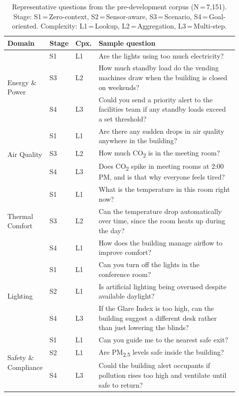 \documentclass[acmsmall]{acmart}
\begin{document}
\begin{table}[t]
\centering
\caption{Representative questions from the pre-development corpus (N\,=\,7{,}151). Stage: S1\,=\,Zero-context, S2\,=\,Sensor-aware, S3\,=\,Scenario, S4\,=\,Goal-oriented. Complexity: L1\,=\,Lookup, L2\,=\,Aggregation, L3\,=\,Multi-step.}
\label{tab:sample-questions}
\scriptsize
\begin{tabular}{@{}p{0.16\linewidth}p{0.06\linewidth}p{0.06\linewidth}p{0.65\linewidth}@{}}
\toprule
\textbf{Domain} & \textbf{Stage} & \textbf{Cpx.} & \textbf{Sample question} \\
\midrule
\multirow{3}{*}{Energy \& Power}
  & S1 & L1 & Are the lights using too much electricity? \\
  & S3 & L2 & How much standby load do the vending machines draw when the building is closed on weekends? \\
  & S4 & L3 & Could you send a priority alert to the facilities team if any standby loads exceed a set threshold? \\
\midrule
\multirow{3}{*}{Air Quality}
  & S1 & L1 & Are there any sudden drops in air quality anywhere in the building? \\
  & S3 & L2 & How much CO\textsubscript{2} is in the meeting room? \\
  & S4 & L3 & Does CO\textsubscript{2} spike in meeting rooms at 2:00\,PM, and is that why everyone feels tired? \\
\midrule
\multirow{3}{*}{Thermal Comfort}
  & S1 & L1 & What is the temperature in this room right now? \\
  & S3 & L2 & Can the temperature drop automatically over time, since the room heats up during the day? \\
  & S4 & L1 & How does the building manage airflow to improve comfort? \\
\midrule
\multirow{3}{*}{Lighting}
  & S1 & L1 & Can you turn off the lights in the conference room? \\
  & S2 & L1 & Is artificial lighting being overused despite available daylight? \\
  & S4 & L3 & If the Glare Index is too high, can the building suggest a different desk rather than just lowering the blinds? \\
\midrule
\multirow{3}{*}{Safety \& Compliance}
  & S1 & L1 & Can you guide me to the nearest safe exit? \\
  & S2 & L1 & Are PM\textsubscript{2.5} levels safe inside the building? \\
  & S4 & L3 & Could the building alert occupants if pollution rises too high and ventilate until safe to return? \\

\end{tabular}
\end{table}
\end{document}
